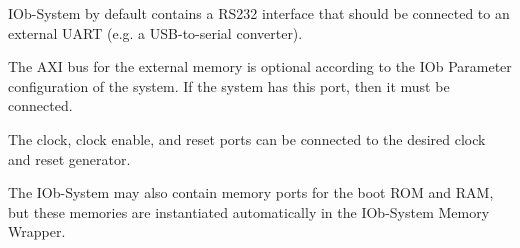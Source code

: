 %

IOb-System by default contains a RS232 interface that should be connected to an external UART (e.g. a USB-to-serial converter).

The AXI bus for the external memory is optional according to the IOb Parameter configuration of the system. If the system has this port, then it must be connected.

The clock, clock enable, and reset ports can be connected to the desired clock and reset generator.

The IOb-System may also contain memory ports for the boot ROM and RAM, but these memories are instantiated automatically in the IOb-System Memory Wrapper.
